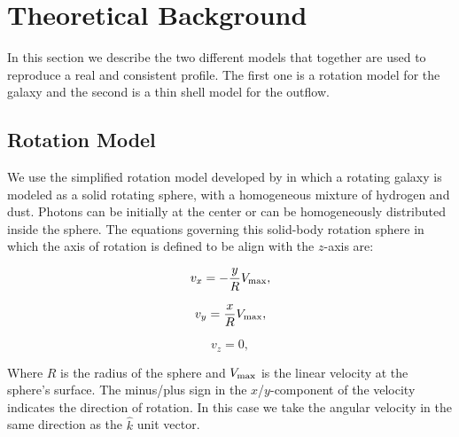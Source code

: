 \documentclass{latex/emulateapj}
\begin{document}


\section{Theoretical Background}
\label{sec:theo}
In this section we describe the two different models that together are used to reproduce a real and consistent \lya profile. The first one is a rotation model for the galaxy and the second is a thin shell model for the outflow. \\

\subsection{Rotation Model}

We use the simplified rotation model developed by \citep{Garavito14} in which a rotating galaxy is modeled as a solid rotating sphere, with a homogeneous mixture of hydrogen and dust. Photons can be initially at the center or can be homogeneously distributed inside the sphere. The equations governing this solid-body rotation sphere in which the axis of rotation is defined to be align with the $z$-axis are:

\begin{equation}
v_{x}=-\frac{y}{R}V_{\rm max}, \label{subeq1}
\end{equation}

\begin{equation}
v_{y}=\frac{x}{R}V_{\rm max}, \label{subeq2}
\end{equation}

\begin{equation}
v_{z}=0, \label{subeq3}
\end{equation}

Where $R$ is the radius of the sphere and $V_{\rm max}$ is the linear velocity at the sphere's surface. The minus/plus sign in the $x$/$y$-component of the velocity indicates the direction of rotation. In this case we take the angular velocity in the same direction as the $\hat{k}$ unit vector.\\
\end{document}
